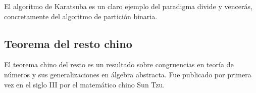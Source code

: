 El algoritmo de Karatsuba es un claro ejemplo del paradigma divide y vencerás, concretamente del algoritmo de partición binaria. 

\subsection{Teorema del resto chino}
El teorema chino del resto es un resultado sobre congruencias en teoría de números y sus generalizaciones en álgebra abstracta. Fue publicado por primera vez en el siglo III por el matemático chino Sun Tzu. 

